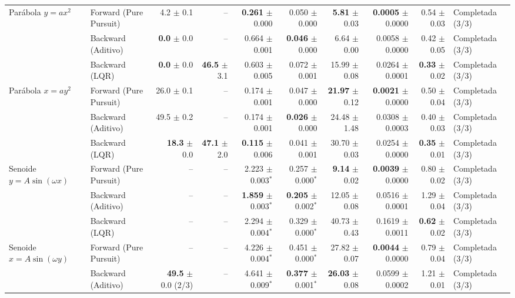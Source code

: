 \begin{table}[htbp]
\begin{tabular}{llrrrrrrrl}
\midrule
Parábola $y = a x^2$ & Forward (Pure Pursuit) & 4.2 $\pm$ 0.1 & -- & \textbf{0.261} $\pm$ 0.000 & 0.050 $\pm$ 0.000 & \textbf{5.81} $\pm$ 0.03 & \textbf{0.0005} $\pm$ 0.0000 & 0.54 $\pm$ 0.03 & Completada (3/3) \\
 & Backward (Aditivo) & \textbf{0.0} $\pm$ 0.0 & -- & 0.664 $\pm$ 0.001 & \textbf{0.046} $\pm$ 0.000 & 6.64 $\pm$ 0.00 & 0.0058 $\pm$ 0.0000 & 0.42 $\pm$ 0.05 & Completada (3/3) \\
 & Backward (LQR) & \textbf{0.0} $\pm$ 0.0 & \textbf{46.5} $\pm$ 3.1 & 0.603 $\pm$ 0.005 & 0.072 $\pm$ 0.001 & 15.99 $\pm$ 0.08 & 0.0264 $\pm$ 0.0001 & \textbf{0.33} $\pm$ 0.02 & Completada (3/3) \\
\midrule
Parábola $x = a y^2$ & Forward (Pure Pursuit) & 26.0 $\pm$ 0.1 & -- & 0.174 $\pm$ 0.001 & 0.047 $\pm$ 0.000 & \textbf{21.97} $\pm$ 0.12 & \textbf{0.0021} $\pm$ 0.0000 & 0.50 $\pm$ 0.04 & Completada (3/3) \\
 & Backward (Aditivo) & 49.5 $\pm$ 0.2 & -- & 0.174 $\pm$ 0.001 & \textbf{0.026} $\pm$ 0.000 & 24.48 $\pm$ 1.48 & 0.0308 $\pm$ 0.0003 & 0.40 $\pm$ 0.03 & Completada (3/3) \\
 & Backward (LQR) & \textbf{18.3} $\pm$ 0.0 & \textbf{47.1} $\pm$ 2.0 & \textbf{0.115} $\pm$ 0.006 & 0.041 $\pm$ 0.001 & 30.70 $\pm$ 0.03 & 0.0254 $\pm$ 0.0000 & \textbf{0.35} $\pm$ 0.01 & Completada (3/3) \\
\midrule
Senoide $y = A\sin(\omega x)$ & Forward (Pure Pursuit) & -- & -- & 2.223 $\pm$ 0.003$^{*}$ & 0.257 $\pm$ 0.000$^{*}$ & \textbf{9.14} $\pm$ 0.02 & \textbf{0.0039} $\pm$ 0.0000 & 0.80 $\pm$ 0.02 & Completada (3/3) \\
 & Backward (Aditivo) & -- & -- & \textbf{1.859} $\pm$ 0.003$^{*}$ & \textbf{0.205} $\pm$ 0.002$^{*}$ & 12.05 $\pm$ 0.08 & 0.0516 $\pm$ 0.0001 & 1.29 $\pm$ 0.04 & Completada (3/3) \\
 & Backward (LQR) & -- & -- & 2.294 $\pm$ 0.004$^{*}$ & 0.329 $\pm$ 0.000$^{*}$ & 40.73 $\pm$ 0.43 & 0.1619 $\pm$ 0.0011 & \textbf{0.62} $\pm$ 0.02 & Completada (3/3) \\
\midrule
Senoide $x = A\sin(\omega y)$ & Forward (Pure Pursuit) & -- & -- & 4.226 $\pm$ 0.004$^{*}$ & 0.451 $\pm$ 0.000$^{*}$ & 27.82 $\pm$ 0.07 & \textbf{0.0044} $\pm$ 0.0000 & 0.79 $\pm$ 0.04 & Completada (3/3) \\
 & Backward (Aditivo) & \textbf{49.5} $\pm$ 0.0 (2/3) & -- & 4.641 $\pm$ 0.009$^{*}$ & \textbf{0.377} $\pm$ 0.001$^{*}$ & \textbf{26.03} $\pm$ 0.08 & 0.0599 $\pm$ 0.0002 & 1.21 $\pm$ 0.01 & Completada (3/3) \\

\end{tabular}
\end{table}
